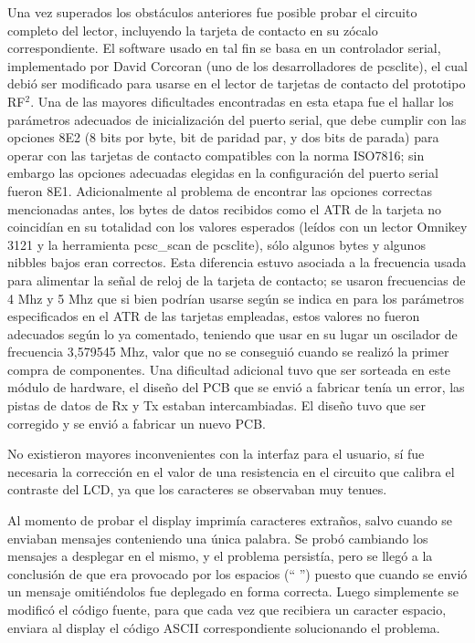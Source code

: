 \bigskip
Una vez superados los obstáculos anteriores fue posible probar el circuito completo del lector, incluyendo 
la tarjeta de contacto en su zócalo correspondiente. El software usado en tal fin se basa en un controlador
serial, implementado por David Corcoran (uno de los desarrolladores de pcsclite), el cual debió ser modificado para usarse en el lector de tarjetas de contacto del prototipo RF$^{2}$. Una de las mayores dificultades encontradas en esta etapa fue el hallar los parámetros adecuados de inicialización del puerto serial, que debe cumplir con las opciones 8E2 (8 bits por byte, bit de paridad par, y dos bits de parada) para operar con las tarjetas de contacto compatibles
con la norma ISO7816; sin embargo las opciones adecuadas elegidas en la configuración del puerto serial fueron 8E1.
Adicionalmente al problema de encontrar las opciones correctas mencionadas antes, los bytes de datos
recibidos como el ATR de la tarjeta no coincidían en su totalidad con los valores esperados (leídos con un lector Omnikey 3121 y la herramienta pcsc\_scan de pcsclite), sólo algunos bytes y algunos nibbles bajos eran correctos.
Esta diferencia estuvo asociada a la frecuencia usada para alimentar la señal de reloj de la tarjeta de contacto;
se usaron frecuencias de 4 Mhz y 5 Mhz que si bien podrían usarse según se indica en \cite{SCHb} para
los parámetros especificados en el ATR de las tarjetas empleadas, estos valores no fueron adecuados según lo ya comentado,
teniendo que usar en su lugar un oscilador de frecuencia 3,579545 Mhz, valor que no se conseguió cuando se realizó
la primer compra de componentes.
Una dificultad adicional tuvo que ser sorteada en este módulo de hardware, el diseño del PCB que se envió a fabricar
tenía un error, las pistas de datos de Rx y Tx estaban intercambiadas. El diseño tuvo que ser corregido y se 
envió a fabricar un nuevo PCB.


\bigskip
\bigskip
{}


No existieron mayores inconvenientes con la interfaz para el usuario, sí fue 
necesaria la corrección en el valor de una resistencia en el circuito que calibra 
el contraste del LCD, ya que los caracteres se observaban muy tenues.

\bigskip
Al momento de probar el display imprimía caracteres extraños, salvo cuando se enviaban mensajes conteniendo una única palabra. Se probó cambiando los mensajes a desplegar en el mismo, y el problema persistía, pero se llegó a la conclusión de que era provocado por los espacios (“ ”) puesto que cuando se envió un mensaje omitiéndolos fue deplegado en forma correcta. Luego simplemente se modificó el código fuente, para que cada vez que recibiera un caracter espacio, enviara al display el código ASCII correspondiente solucionando el problema.

